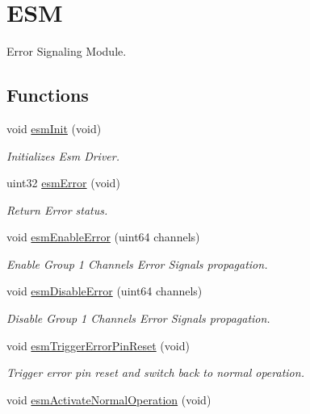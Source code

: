 \hypertarget{group__ESM}{}\section{E\+SM}
\label{group__ESM}


Error Signaling Module.  


\subsection*{Functions}
\begin{DoxyCompactItemize}
\item 
void \mbox{\hyperlink{group__ESM_ga3ebbcbb33cba761eba56edcf1aeb9961}{esm\+Init}} (void)
\begin{DoxyCompactList}\small\item\em Initializes Esm Driver. \end{DoxyCompactList}\item 
uint32 \mbox{\hyperlink{group__ESM_gaf9c1cb3cf58b215f603e7ada115deffb}{esm\+Error}} (void)
\begin{DoxyCompactList}\small\item\em Return Error status. \end{DoxyCompactList}\item 
void \mbox{\hyperlink{group__ESM_ga918dbc559401efc341d6b1cc1fa5a5c2}{esm\+Enable\+Error}} (uint64 channels)
\begin{DoxyCompactList}\small\item\em Enable Group 1 Channels Error Signals propagation. \end{DoxyCompactList}\item 
void \mbox{\hyperlink{group__ESM_ga2b2070b83e6693afda68fdb49ebccc02}{esm\+Disable\+Error}} (uint64 channels)
\begin{DoxyCompactList}\small\item\em Disable Group 1 Channels Error Signals propagation. \end{DoxyCompactList}\item 
void \mbox{\hyperlink{group__ESM_gaa830bed2b9fc364b96269ff0baa8c395}{esm\+Trigger\+Error\+Pin\+Reset}} (void)
\begin{DoxyCompactList}\small\item\em Trigger error pin reset and switch back to normal operation. \end{DoxyCompactList}\item 
void \mbox{\hyperlink{group__ESM_ga9c80550059c5da2e680f73c5c06603b5}{esm\+Activate\+Normal\+Operation}} (void)

\end{DoxyCompactItemize}
